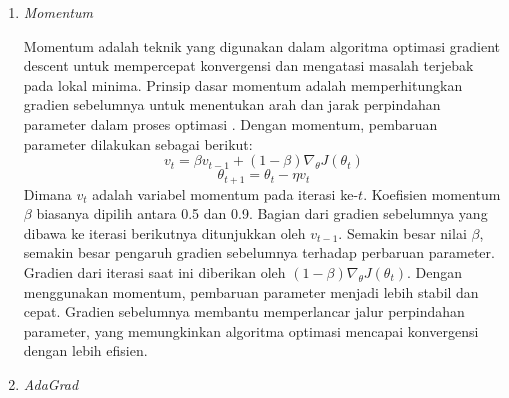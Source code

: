 \begin{enumerate}
    \item \textit{Momentum}
    
    Momentum adalah teknik yang digunakan dalam algoritma optimasi gradient descent untuk mempercepat konvergensi dan mengatasi masalah terjebak pada lokal minima. Prinsip dasar momentum adalah memperhitungkan gradien sebelumnya untuk menentukan arah dan jarak perpindahan parameter dalam proses optimasi \cite{GoodBengCour16}. Dengan momentum, pembaruan parameter dilakukan sebagai berikut:
    \begin{equation}
        v_t = \beta v_{t-1} + (1 - \beta) \nabla_\theta J(\theta_t)
    \end{equation}
    \begin{equation}
        \theta_{t+1} = \theta_t - \eta v_t
    \end{equation}
    Dimana \(v_t\) adalah variabel momentum pada iterasi ke-\(t\). Koefisien momentum \(\beta\) biasanya dipilih antara 0.5 dan 0.9. Bagian dari gradien sebelumnya yang dibawa ke iterasi berikutnya ditunjukkan oleh \(v_{t-1}\). Semakin besar nilai \(\beta\), semakin besar pengaruh gradien sebelumnya terhadap perbaruan parameter. Gradien dari iterasi saat ini diberikan oleh \((1 - \beta) \nabla_\theta J(\theta_t)\). Dengan menggunakan momentum, pembaruan parameter menjadi lebih stabil dan cepat. Gradien sebelumnya membantu memperlancar jalur perpindahan parameter, yang memungkinkan algoritma optimasi mencapai konvergensi dengan lebih efisien.
    
    \item \textit{AdaGrad}
    

\end{enumerate}
